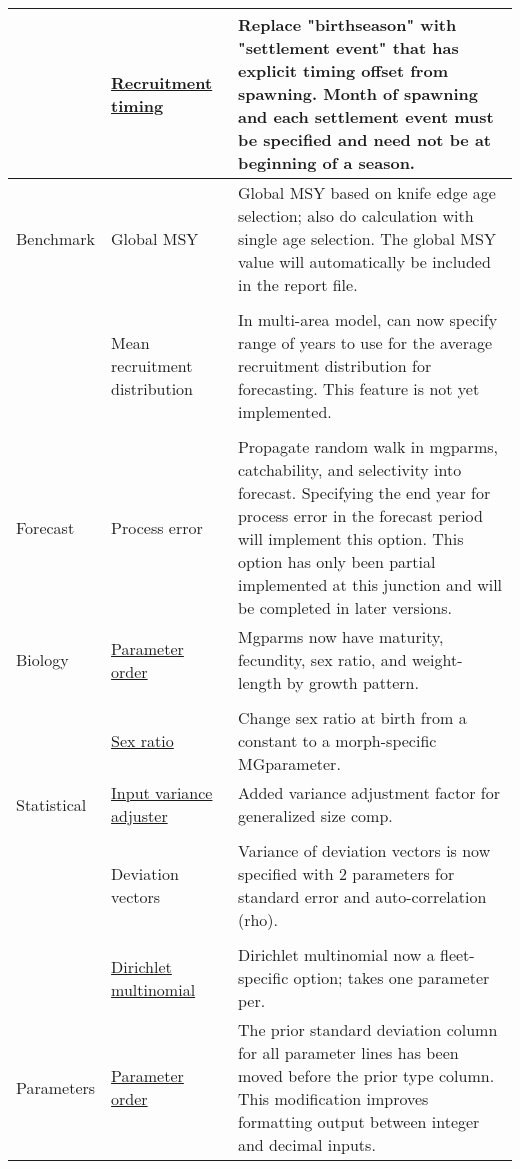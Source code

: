 \begin{center}
\begin{longtable}{p{2cm} p{3cm} p{10cm}}
					& \hyperlink{RecrTiming}{Recruitment timing} & 
						Replace "birthseason" with "settlement event" that has explicit timing offset from spawning.  Month of spawning and each settlement event must be specified and need not be at beginning of a season.\\
				\hline
				Benchmark 
					& Global MSY &  
						Global MSY based on knife edge age selection; also do calculation with single age selection. The global MSY value will automatically be included in the report file.\\
				  \\					
					& Mean recruitment distribution & 
						In multi-area model, can now specify range of years to use for the average recruitment distribution for forecasting. This feature is not yet implemented. \\
				  \\
				\hline
				Forecast & 
					Process error & 
						Propagate random walk in mgparms, catchability, and selectivity into forecast. Specifying the end year for process error in the forecast period will implement this option.  This option has only been partial implemented at this junction and will be completed in later versions.\\
				\hline
				Biology 
					& \hyperlink{MGorder}{Parameter order} & 
						Mgparms now have maturity, fecundity, sex ratio, and weight-length by growth pattern.\\
				  \\						
				    & \hyperlink{SexRatio}{Sex ratio} & 
					    Change sex ratio at birth from a constant to a morph-specific MGparameter. \\
				\hline
				Statistical 
					& \hyperlink{GcompVar}{Input variance adjuster} & 
						Added variance adjustment factor for generalized size comp. \\
				  \\						
					& Deviation vectors & 
						Variance of deviation vectors is now specified with 2 parameters for standard error and auto-correlation (rho).\\
				  \\						
					& \hyperlink{Dirichlet}{Dirichlet multinomial} & 
						Dirichlet multinomial now a fleet-specific option; takes one parameter per. \\
				\hline
				Parameters 
					& \hyperlink{paraOrder}{Parameter order} & The prior standard deviation column for all parameter lines has been moved before the prior type column.  This modification improves formatting output between integer and decimal inputs.\\ 

\end{longtable}
\end{center}
